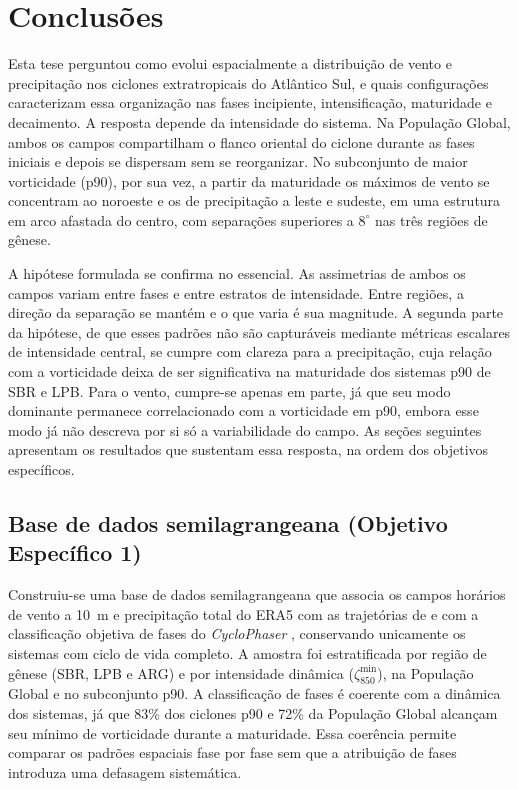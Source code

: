 \chapter{Conclusões}\label{ch:conclusiones}

Esta tese perguntou como evolui espacialmente a distribuição de vento e precipitação nos ciclones extratropicais do Atlântico Sul, e quais configurações caracterizam essa organização nas fases incipiente, intensificação, maturidade e decaimento. A resposta depende da intensidade do sistema. Na População Global, ambos os campos compartilham o flanco oriental do ciclone durante as fases iniciais e depois se dispersam sem se reorganizar. No subconjunto de maior vorticidade (p90), por sua vez, a partir da maturidade os máximos de vento se concentram ao noroeste e os de precipitação a leste e sudeste, em uma estrutura em arco afastada do centro, com separações superiores a $8^{\circ}$ nas três regiões de gênese.

A hipótese formulada se confirma no essencial. As assimetrias de ambos os campos variam entre fases e entre estratos de intensidade. Entre regiões, a direção da separação se mantém e o que varia é sua magnitude. A segunda parte da hipótese, de que esses padrões não são capturáveis mediante métricas escalares de intensidade central, se cumpre com clareza para a precipitação, cuja relação com a vorticidade deixa de ser significativa na maturidade dos sistemas p90 de SBR e LPB. Para o vento, cumpre-se apenas em parte, já que seu modo dominante permanece correlacionado com a vorticidade em p90, embora esse modo já não descreva por si só a variabilidade do campo. As seções seguintes apresentam os resultados que sustentam essa resposta, na ordem dos objetivos específicos.

\section{Base de dados semilagrangeana (Objetivo Específico 1)}

Construiu-se uma base de dados semilagrangeana que associa os campos horários de vento a 10~m e precipitação total do ERA5 com as trajetórias de \citet{gramcianinov2020analysis} e com a classificação objetiva de fases do \textit{CycloPhaser} \citep{coutodesouza2024new, deSouza2025CycloPhaser}, conservando unicamente os sistemas com ciclo de vida completo. A amostra foi estratificada por região de gênese (SBR, LPB e ARG) e por intensidade dinâmica ($\zeta_{850}^{\min}$), na População Global e no subconjunto p90. A classificação de fases é coerente com a dinâmica dos sistemas, já que 83\% dos ciclones p90 e 72\% da População Global alcançam seu mínimo de vorticidade durante a maturidade. Essa coerência permite comparar os padrões espaciais fase por fase sem que a atribuição de fases introduza uma defasagem sistemática.

